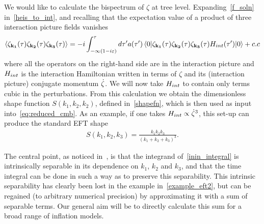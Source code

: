 We would like to calculate the bispectrum of $\zeta$ at tree level.
Expanding~\eqref{f_soln} in~\eqref{heis_to_int}, and recalling that
the expectation value of a product of three interaction picture fields vanishes
\begin{align}\label{inin_integral}
{
    \left< \zeta_{\mathbf{k_1}}(\tau)\zeta_{\mathbf{k_2}}(\tau)\zeta_{\mathbf{k_3}}(\tau) \right>
=-i\int_{-\infty(1-i\varepsilon)}^{\tau}d\tau'a(\tau')
    \left<0\lvert \zeta_{\mathbf{k_1}}(\tau)\zeta_{\mathbf{k_2}}(\tau)\zeta_{\mathbf{k_3}}(\tau)H_{int}(\tau') \rvert0\right>+c.c
}
\end{align}
where all the operators on the right-hand side are in the interaction picture
and $H_{int}$ is the interaction Hamiltonian written in terms of $\zeta$ and its
(interaction picture) conjugate momentum $\dot{\zeta}$.
We will now take $H_{int}$ to contain only terms cubic in the perturbations.
From this calculation we obtain the dimensionless shape function $S(k_1,k_2,k_2)$,
defined in~\eqref{shapefn},
which is then used as input into~\eqref{eq:reduced_cmb}.
As an example, if one takes $H_{int}\propto\dot{\zeta}^3$, this set-up can produce the standard EFT shape
\begin{align}\label{example_eft2}
    S(k_1, k_2, k_3) = \frac{k_1k_2k_3}{(k_1+k_2+k_3)^3}.
\end{align}

The central point, as noticed in~\cite{Funakoshi}, is that the
integrand of~\eqref{inin_integral} is intrinsically separable
in its dependence on $k_1$, $k_2$ and $k_3$, and that the time integral
can be done in such a way as to preserve this separability.
This intrinsic separability has clearly been lost in
the example in~\eqref{example_eft2},
but can be regained (to arbitrary numerical precision) by approximating it
with a sum of separable terms. Our general aim will be to directly calculate
this sum for a broad range of inflation models.




